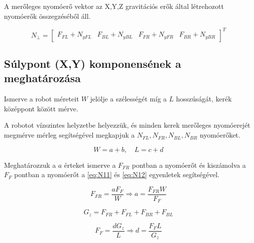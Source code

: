 A merőleges nyomóerő vektor az X,Y,Z gravitációs erők által létrehozott nyomóerők összegzéséből áll.


\begin{equation}
\label{eq:N8}
N_\perp =\begin{bmatrix}
F_{FL} + N_{yFL} & F_{BL} +  N_{yBL} & F_{FR} +  N_{yFR} & F_{BR} +  N_{yBR}
\end{bmatrix}^T
\end{equation}

\subsection{Súlypont (X,Y) komponensének a meghatározása}

Ismerve a robot méreteit $W$ jelölje a szélességét  míg a $L$ hosszúságát, kerék középpont között mérve.

A robotot vízszintes helyzetbe helyezzük, és minden kerek merőleges nyomóerejét megmérve mérleg segítségével megkapjuk a
$N_{FL},N_{FR},N_{BL},N_{BR}$ nyomóerőket.

\begin{equation}
\label{eq:N9}
W = a+b,\quad L = c+d
\end{equation}

Meghatározzuk a $a$ érteket ismerve a $F_{FR}$ pontban a nyomóerőt és kiszámolva a $F_F$ pontban a nyomóerőt a \ref{eq:N11} és \ref{eq:N12} egyenletek segítségével.

\begin{equation}
\label{eq:N10}
F_{FR}=\frac{aF_F}{W} \Rightarrow a = \frac{F_{FR}W}{F_F}
\end{equation}

\begin{equation}
\label{eq:N11}
G_{z}=F_{FR}+ F_{FL}+ F_{BR}+ F_{BL} 
\end{equation}

\begin{equation}
\label{eq:N12}
F_{F}=\frac{dG_z}{L} \Rightarrow d = \frac{F_{F}L}{G_z}
\end{equation}









